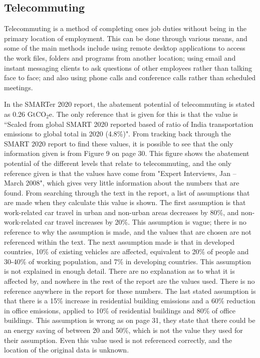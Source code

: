 \subsection{Telecommuting}

Telecommuting is a method of completing ones job duties without being in the primary location of employment. This can be done through various means, and some of the main methods include using remote desktop applications to access the work files, folders and programs from another location; using email and instant messaging clients to ask questions of other employees rather than talking face to face; and also using phone calls and conference calls rather than scheduled meetings. 

In the SMARTer 2020 report, the abatement potential of telecommuting is stated as 0.26 GtCO$_2$e. The only reference that is given for this is that the value is ``Scaled from global SMART 2020 reported based of ratio of India transportation emissions to global total in 2020 (4.8\%)". From tracking back through the SMART 2020 report to find these values, it is possible to see that the only information given is from Figure 9 on page 30. This figure shows the abatement potential of the different levels that relate to telecommuting, and the only reference given is that the values have come from "Expert Interviews, Jan – March 2008", which gives very little information about the numbers that are found. From searching through the text in the report, a list of assumptions that are made when they calculate this value is shown. The first assumption is that work-related car travel in urban and non-urban areas decreases by 80\%, and non-work-related car travel increases by 20\%. This assumption is vague; there is no reference to why the assumption is made, and the values that are chosen are not referenced within the text.
The next assumption made is that in developed countries, 10\% of existing vehicles are affected, equivalent to 20\% of people and 30-40\% of working population, and 7\% in developing countries. This assumption is not explained in enough detail. There are no explanation as to what it is affected by, and nowhere in the rest of the report are the values used. There is no reference anywhere in the report for these numbers.
The last stated assumption is that there is a 15\% increase in residential building emissions and a 60\% reduction in office emissions, applied to 10\% of residential buildings and 80\% of office buildings. This assumption is wrong as on page 31, they state that there could be an energy saving of between 20 and 50\%, which is not the value they used for their assumption. Even this value used is not referenced correctly, and the location of the original data is unknown.

